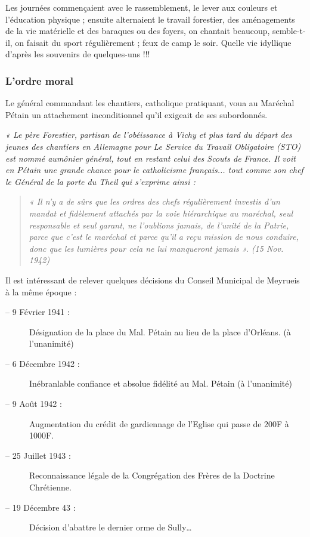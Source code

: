Les journées commençaient avec le rassemblement, le lever aux couleurs et
l’éducation physique ; ensuite alternaient le travail forestier, des aménagements de la
vie matérielle et des baraques ou des foyers, on chantait beaucoup, semble-t-il, on
faisait du sport régulièrement ; feux de camp le soir.
Quelle vie idyllique d’après les souvenirs de quelques-uns !!!


\subsubsection{L’ordre moral}

Le général commandant les chantiers, catholique pratiquant, voua au Maréchal
Pétain un attachement inconditionnel qu’il exigeait de ses subordonnés.

\emph{« Le père Forestier, partisan de l’obéissance à Vichy et plus tard du départ des
jeunes des chantiers en Allemagne pour Le Service du Travail Obligatoire (STO) est
nommé aumônier général, tout en restant celui des Scouts de France. Il voit en
Pétain une grande chance pour le catholicisme français... tout comme son chef le
Général de la porte du Theil qui s’exprime ainsi :}

\begin{quote}
\emph{« Il n’y a de sûrs que les ordres des chefs régulièrement investis d’un mandat et fidèlement attachés
par la voie hiérarchique au maréchal, seul responsable et seul garant, ne l’oublions jamais, de l’unité
de la Patrie, parce que c’est le maréchal et parce qu’il a reçu mission de nous conduire, donc que les
lumières pour cela ne lui manqueront jamais ». (15 Nov. 1942)}
\end{quote}

Il est intéressant de relever quelques décisions du Conseil Municipal de Meyrueis à la même époque :

\begin{description}
\item[-- 9 Février 1941 :] Désignation de la place du Mal. Pétain au lieu de la place d’Orléans. (à l'unanimité)
\item[-- 6 Décembre 1942 :] Inébranlable confiance et absolue fidélité au Mal. Pétain (à l’unanimité)
\item[-- 9 Août 1942 :] Augmentation du crédit de gardiennage de l’Eglise qui passe de 200F à 1000F.
\item[-- 25 Juillet 1943 :] Reconnaissance légale de la Congrégation des Frères de la Doctrine Chrétienne.
\item[-- 19 Décembre 43 :] Décision d’abattre le dernier orme de Sully…
\end{description}

